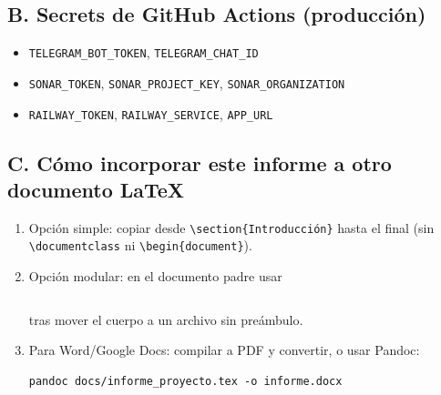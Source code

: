 \documentclass[12pt,a4paper]{article}
\begin{document}
\subsection{B. Secrets de GitHub Actions (producción)}
\begin{itemize}[leftmargin=1.5em]
  \item \texttt{TELEGRAM\_BOT\_TOKEN}, \texttt{TELEGRAM\_CHAT\_ID}
  \item \texttt{SONAR\_TOKEN}, \texttt{SONAR\_PROJECT\_KEY}, \texttt{SONAR\_ORGANIZATION}
  \item \texttt{RAILWAY\_TOKEN}, \texttt{RAILWAY\_SERVICE}, \texttt{APP\_URL}
\end{itemize}

\subsection{C. Cómo incorporar este informe a otro documento \LaTeX}
\begin{enumerate}[leftmargin=1.5em]
  \item Opción simple: copiar desde \verb|\section{Introducción}| hasta el final
        (sin \verb|\documentclass| ni \verb|\begin{document}|).
  \item Opción modular: en el documento padre usar
        \begin{lstlisting}

        \end{lstlisting}
        tras mover el cuerpo a un archivo sin preámbulo.
  \item Para Word/Google Docs: compilar a PDF y convertir, o usar Pandoc:
        \begin{lstlisting}
pandoc docs/informe_proyecto.tex -o informe.docx
        \end{lstlisting}
\end{enumerate}
\end{document}
